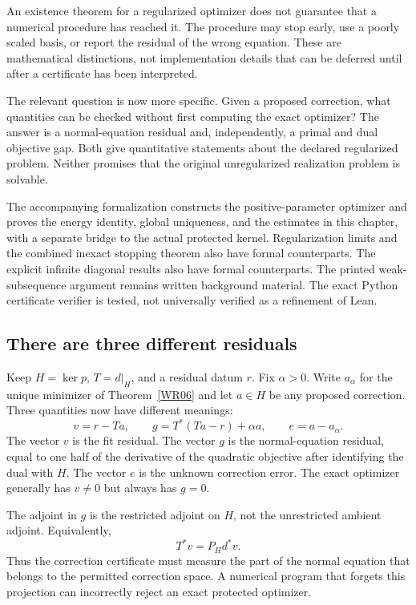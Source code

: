 \label{sec:inexact-repair}
An existence theorem for a regularized optimizer does not guarantee that a numerical procedure has reached it. The procedure may stop early, use a poorly scaled basis, or report the residual of the wrong equation. These are mathematical distinctions, not implementation details that can be deferred until after a certificate has been interpreted.

The relevant question is now more specific. Given a proposed correction, what quantities can be checked without first computing the exact optimizer? The answer is a normal-equation residual and, independently, a primal and dual objective gap. Both give quantitative statements about the declared regularized problem. Neither promises that the original unregularized realization problem is solvable.

\begin{scopebox}
The accompanying formalization constructs the positive-parameter optimizer and proves the energy identity, global uniqueness, and the estimates in this chapter, with a separate bridge to the actual protected kernel. Regularization limits and the combined inexact stopping theorem also have formal counterparts. The explicit infinite diagonal results also have formal counterparts. The printed weak-subsequence argument remains written background material. The exact Python certificate verifier is tested, not universally verified as a refinement of Lean.
\end{scopebox}

\subsection{There are three different residuals}
Keep $H=\ker p$, $T=d|_H$, and a residual datum $r$. Fix $\alpha>0$. Write $a_\alpha$ for the unique minimizer of Theorem~\ref{WR06} and let $a\in H$ be any proposed correction. Three quantities now have different meanings:
\[
 v=r-Ta,\qquad
 g=T^*(Ta-r)+\alpha a,\qquad
 e=a-a_\alpha.
\]
The vector $v$ is the fit residual. The vector $g$ is the normal-equation residual, equal to one half of the derivative of the quadratic objective after identifying the dual with $H$. The vector $e$ is the unknown correction error. The exact optimizer generally has $v\ne0$ but always has $g=0$.

The adjoint in $g$ is the restricted adjoint on $H$, not the unrestricted ambient adjoint. Equivalently,
\[
 T^*v=P_Hd^*v.
\]
Thus the correction certificate must measure the part of the normal equation that belongs to the permitted correction space. A numerical program that forgets this projection can incorrectly reject an exact protected optimizer.

